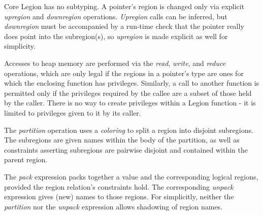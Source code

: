 Core Legion has no subtyping. A pointer's region is changed only via explicit
{\em upregion} and {\em downregion} operations.  {\em Upregion} calls can be inferred,
but {\em downregion} must be accompanied by a run-time check that the pointer really does
point into the subregion(s), so {\em upregion} is made explicit as well for simplicity.

Accesses to heap memory are performed via the {\em read}, {\em write}, and {\em reduce}
operations, which are only legal if the regions in a pointer's type are ones for which the
enclosing function has privileges.
Similarly, a call to another function is permitted only if the privileges required by the 
callee are a subset of those held by the caller.  There is no way to create privileges within
a Legion function - it is limited to privileges given to it by its caller.

The {\em partition} operation uses a {\em coloring} to split a region into 
disjoint subregions.  The subregions are given names within the body of the partition,
as well as constraints asserting subregions are pairwise disjoint and contained within the parent region.

The {\em pack} expression packs together a value and the corresponding logical regions,
provided the region relation's constraints hold.  The
corresponding {\em unpack} expression gives (new) names to those regions.  For simplicitly, neither the 
{\em partition} nor the {\em unpack} expression allows shadowing of region names.

